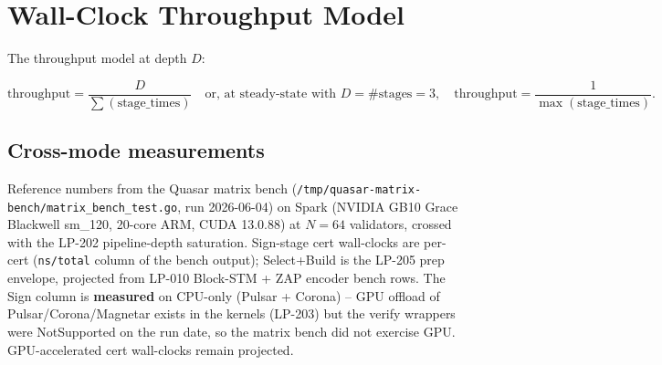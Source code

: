 \section{Wall-Clock Throughput Model}

The throughput model at depth $D$:

\begin{equation}
\textrm{throughput} = \frac{D}{\sum(\textrm{stage\_times})}
\quad\text{or, at steady-state with } D = \#\textrm{stages} = 3,\quad
\textrm{throughput} = \frac{1}{\max(\textrm{stage\_times})}.
\end{equation}

\subsection{Cross-mode measurements}

Reference numbers from the Quasar matrix bench
(\texttt{/tmp/quasar-matrix-bench/matrix\_bench\_test.go}, run
2026-06-04) on Spark (NVIDIA GB10 Grace Blackwell sm\_120,
20-core ARM, CUDA 13.0.88) at $N{=}64$ validators, crossed with
the LP-202 pipeline-depth saturation. Sign-stage cert wall-clocks
are per-cert (\texttt{ns/total} column of the bench output);
Select+Build is the LP-205 prep envelope, projected from LP-010
Block-STM + ZAP encoder bench rows. The Sign column is
\textbf{measured} on CPU-only (Pulsar + Corona) -- GPU offload of
Pulsar/Corona/Magnetar exists in the kernels (LP-203) but the
verify wrappers were NotSupported on the run date, so the matrix
bench did not exercise GPU. GPU-accelerated cert wall-clocks
remain projected.

